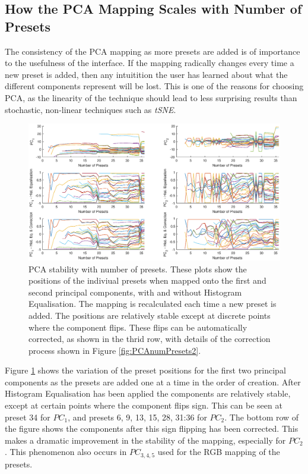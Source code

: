 \documentclass[11pt, oneside]{report}   	%
\begin{document}
\subsection{How the PCA Mapping Scales with Number of Presets}
The consistency of the PCA mapping as more presets are added is of importance to the usefulness of the interface. If the mapping radically changes every time a new preset is added, then any intuitition the user has learned about what the different components represent will be lost. This is one of the reasons for choosing PCA, as the linearity of the technique should lead to less surprising results than stochastic, non-linear techniques such as \emph{tSNE}.\\
\begin{figure}[h]
	\hspace{-80pt}
	\includegraphics[trim={0, 1cm, 0, 1cm}, clip, width = 8.5in]{PCAnumPresets1.eps}
	\caption{PCA stability with number of presets. These plots show the positions of the indiviual presets when mapped onto the first and second principal components, with and without Histogram Equalisation. The mapping is recalculated each time a new preset is added. The positions are relatively stable except at discrete points where the component flips. These flips can be automatically corrected, as shown in the thrid row, with details of the correction process shown in Figure \ref{fig:PCAnumPresets2}.}
	\label{fig:PCAnumPresets}
		\vspace{-10pt}
\end{figure}
Figure \ref{fig:PCAnumPresets} shows the variation of the preset positions for the first two principal components as the presets are added one at a time in the order of creation. After Histogram Equalisation has been applied the components are relatively stable, except at certain points where the component flips sign. This can be seen at preset 34 for $PC_1$, and presets 6, 9, 13, 15, 28, 31:36 for $PC_2$. The bottom row of the figure shows the components after this sign flipping has been corrected. This makes a dramatic improvement in the stability of the mapping, especially for $PC_2$. This phenomenon also occurs in $PC_{3,4,5}$ used for the RGB mapping of the presets.
\end{document}
